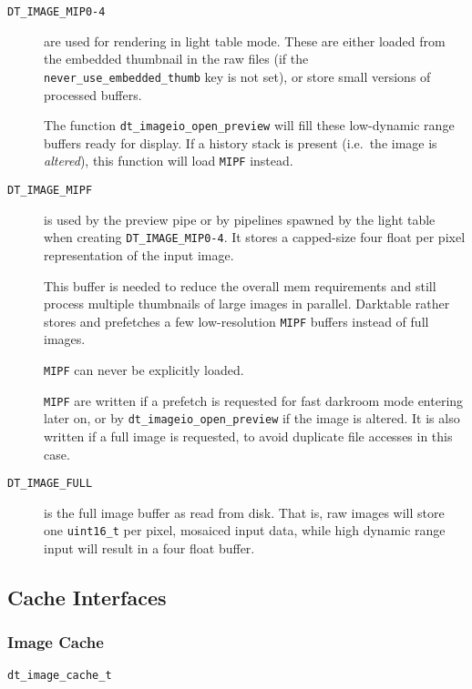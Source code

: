 \documentclass[a4paper,twoside]{scrartcl}
\newcommand{\code}[1]{\texttt{\color{codecol}#1}}
\begin{document}
\begin{description}
  \item[\code{DT\_IMAGE\_MIP0-4}] are used for rendering in light table mode. These are either loaded from the embedded
    thumbnail in the raw files (if the \code{never\_use\_embedded\_thumb} key is not set), or store small versions of
    processed buffers.

    The function \code{dt\_imageio\_open\_preview} will fill these low-dynamic range buffers ready for display. If a history
    stack is present (i.e.\ the image is {\em altered}), this function will load \code{MIPF} instead.

  \item[\code{DT\_IMAGE\_MIPF}] is used by the preview pipe or by pipelines spawned by the light table when creating
    \code{DT\_IMAGE\_MIP0-4}. It stores a capped-size four float per pixel representation of the input image.

    This buffer is needed to reduce the overall mem requirements and still process multiple thumbnails of large images
    in parallel. Darktable rather stores and prefetches a few low-resolution \code{MIPF} buffers instead of full images.

    \code{MIPF} can never be explicitly loaded.

    \code{MIPF} are written if a prefetch is requested for fast darkroom mode entering later on, or by \code{dt\_imageio\_open\_preview}
    if the image is altered. It is also written if a full image is requested, to avoid duplicate file accesses in this case.

  \item[\code{DT\_IMAGE\_FULL}] is the full image buffer as read from disk. That is, raw images will store one \code{uint16\_t}
    per pixel, mosaiced input data, while high dynamic range input will result in a four float buffer.

\end{description}


\newpage
\subsection{Cache Interfaces}

\subsubsection{Image Cache}

\code{dt\_image\_cache\_t}
\end{document}
